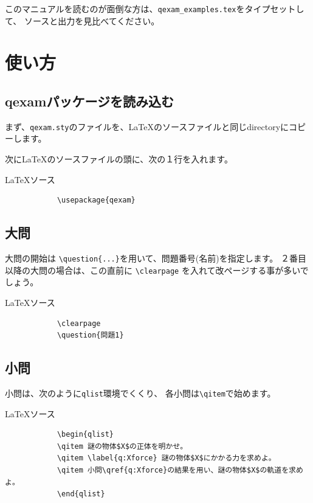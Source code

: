 \documentclass[dvipdfmx,a4j,11pt]{jarticle}
\newenvironment{inputbox}{%
	\begin{itembox}[r]{\LaTeX ソース}
}{
	\end{itembox}
}
\newenvironment{outputbox}{%
	\begin{itembox}[r]{出力}
}{%
	\end{itembox}
}
\begin{document}
	このマニュアルを読むのが面倒な方は、{\tt qexam\_examples.tex}をタイプセットして、
	ソースと出力を見比べてください。
	
\section{使い方}
\subsection{{\bf qexam}パッケージを読み込む}
	まず、{\tt qexam.sty}のファイルを、\LaTeX のソースファイルと同じdirectoryにコピーします。
	
	次に\LaTeX のソースファイルの頭に、次の１行を入れます。
	\begin{inputbox}
		\begin{verbatim}
			\usepackage{qexam}
		\end{verbatim}
	\end{inputbox}
	
		
\subsection{大問}
	大問の開始は
	{\tt \verb"\question{...}"}を用いて、問題番号(名前)を指定します。
	２番目以降の大問の場合は、この直前に
		\verb"\clearpage"
	を入れて改ページする事が多いでしょう。
	\begin{inputbox}
		\begin{verbatim}
			\clearpage
			\question{問題1}
		\end{verbatim}
	\end{inputbox}
	
	
	
\subsection{小問}
	 小問は、次のように{\tt qlist}環境でくくり、
	 各小問は{\tt \textbackslash qitem}で始めます。

	 \begin{inputbox}
		\begin{verbatim}
			\begin{qlist}
		    \qitem 謎の物体$X$の正体を明かせ。
		    \qitem \label{q:Xforce} 謎の物体$X$にかかる力を求めよ。
		    \qitem 小問\qref{q:Xforce}の結果を用い、謎の物体$X$の軌道を求めよ。
			\end{qlist}
		\end{verbatim}
	\end{inputbox}
	
\end{document}
